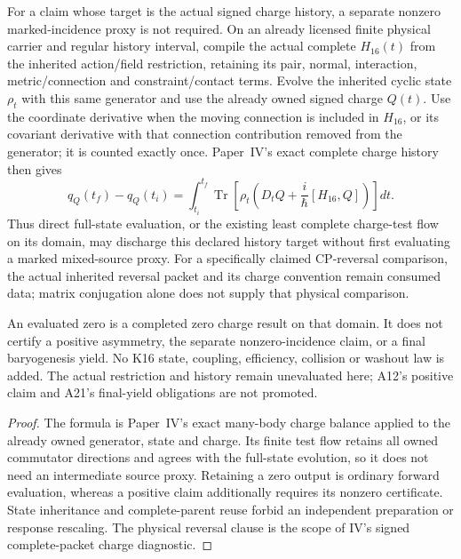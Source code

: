 \documentclass[12pt,a4paper]{article}
\begin{document}
\begin{corollary}
\label{p5c:cor:v2186-direct-signed-charge-target}
For a claim whose target is the actual signed charge history, a separate
nonzero marked-incidence proxy is not required. On an already licensed
finite physical carrier and regular history interval, compile the actual
complete $H_{16}(t)$ from the inherited action/field restriction, retaining
its pair, normal, interaction, metric/connection and constraint/contact
terms. Evolve the inherited cyclic state $\rho_t$ with this same generator
and use the already owned signed charge $Q(t)$. Use the coordinate derivative
when the moving connection is included in $H_{16}$, or its covariant derivative
with that connection contribution removed from the generator; it is counted
exactly once. Paper~IV's exact complete charge history then gives
\[
 \boxed{q_Q(t_f)-q_Q(t_i)
 =\int_{t_i}^{t_f}\operatorname{Tr}\!\left[
 \rho_t\left(D_tQ+\frac{i}{\hbar}[H_{16},Q]\right)\right]dt.}
\]
Thus direct full-state evaluation, or the existing least complete charge-test
flow on its domain, may discharge this declared history target without
first evaluating a marked mixed-source proxy. For a specifically claimed
CP-reversal comparison, the actual inherited reversal packet and its charge
convention remain consumed data; matrix conjugation alone does not supply
that physical comparison.

An evaluated zero is a completed zero charge result on that domain. It does
not certify a positive asymmetry, the separate nonzero-incidence claim, or a
final baryogenesis yield. No K16 state, coupling, efficiency, collision or
washout law is added. The actual restriction and history remain unevaluated
here; A12's positive claim and A21's final-yield obligations are not promoted.
\end{corollary}
\begin{proof}
The formula is Paper~IV's exact many-body charge balance applied to the
already owned generator, state and charge. Its finite test flow retains all
owned commutator directions and agrees with the full-state evolution, so
it does not need an intermediate source proxy. Retaining a zero output is
ordinary forward evaluation, whereas a positive claim additionally requires
its nonzero certificate. State inheritance and complete-parent reuse forbid
an independent preparation or response rescaling. The physical reversal
clause is the scope of IV's signed complete-packet charge diagnostic.
\end{proof}
\end{document}
